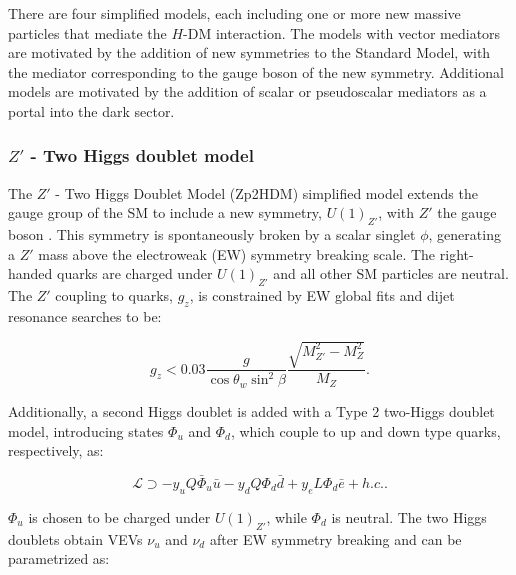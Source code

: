 \indent There are four simplified models, each including one or more new massive particles that mediate the $H$-DM interaction. The models with vector mediators are motivated by the addition of new symmetries to the Standard Model, with the mediator corresponding to the gauge boson of the new symmetry. Additional models are motivated by the addition of scalar or pseudoscalar mediators as a portal into the dark sector.

\subsubsection{$Z'$ - Two Higgs doublet model}

The $Z'$ - Two Higgs Doublet Model (Zp2HDM) simplified model extends the gauge group of the SM to include a new symmetry, $U(1)_{Z'}$, with $Z'$ the gauge boson \cite{Berlin:2014cfa}. This symmetry is spontaneously broken by a scalar singlet $\phi$, generating a $Z'$ mass above the electroweak (EW) symmetry breaking scale. The right-handed quarks are charged under $U(1)_{Z'}$ and all other SM particles are neutral. The $Z'$ coupling to quarks, $g_z$, is constrained by EW global fits \cite{PhysRevD.86.010001} and dijet resonance searches \cite{Aaltonen:2008dn, Chatrchyan:2013qha} to be:

\begin{equation}
g_z < 0.03 \frac{g}{\cos\theta_w\sin^2\beta}\frac{\sqrt{M_{Z'}^2-M_Z^2}}{M_Z}.
\end{equation}

Additionally, a second Higgs doublet is added with a Type 2 two-Higgs doublet model, introducing states $\Phi_u$ and $\Phi_d$, which couple to up and down type quarks, respectively, as:

\begin{equation}
\mathcal{L} \supset -y_u Q \bar{\Phi}_u \bar{u} - y_d Q \Phi_d \bar{d} + y_e L \Phi_d \bar{e} + h.c..
\end{equation}

$\Phi_u$ is chosen to be charged under $U(1)_{Z'}$, while $\Phi_d$ is neutral. The two Higgs doublets obtain VEVs $\nu_u$ and $\nu_d$ after EW symmetry breaking and can be parametrized as:

